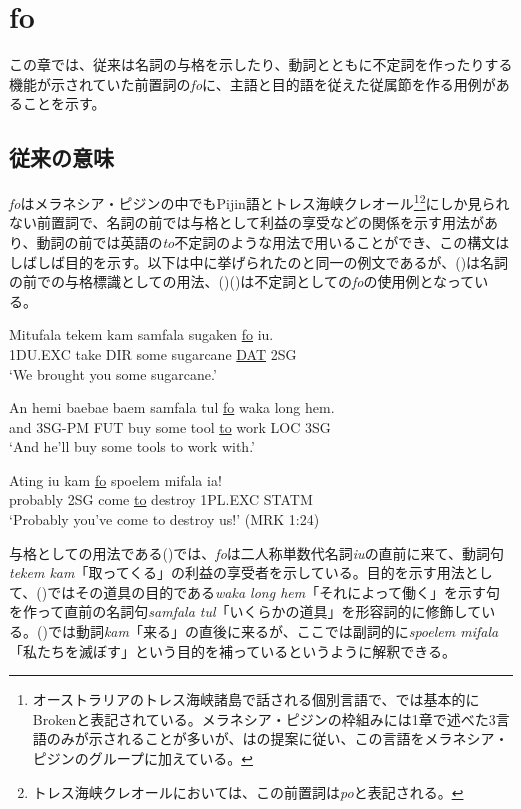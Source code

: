 \chapter{fo}
この章では、従来は名詞の与格を示したり、動詞とともに不定詞を作ったりする機能が示されていた前置詞の\textit{fo}に、主語と目的語を従えた従属節を作る用例があることを示す。

\section{従来の意味}
\textit{fo}はメラネシア・ピジンの中でもPijin語とトレス海峡クレオール\footnote{\label{fn:broken}
オーストラリアのトレス海峡諸島で話される個別言語で、\cite{prepositions}では基本的にBrokenと表記されている。メラネシア・ピジンの枠組みには1章で述べた3言語のみが示されることが多いが、\cite{prepositions}は\cite{keesing}の提案に従い、この言語をメラネシア・ピジンのグループに加えている。}\footnote{トレス海峡クレオールにおいては、この前置詞は\textit{po}と表記される\citep{prepositions}。}にしか見られない前置詞で、名詞の前では与格として利益の享受などの関係を示す用法があり、動詞の前では英語の\textit{to}不定詞のような用法で用いることができ、この構文はしばしば目的を示す\citep{prepositions}。以下は\cite{prepositions}中に挙げられたのと同一の例文であるが、()は名詞の前での与格標識としての用法、()()は不定詞としての\textit{fo}の使用例となっている。

\begin{exe}
\ex
\gll Mitufala tekem kam samfala sugaken \underline{fo} iu.\\
1DU.EXC take DIR some sugarcane \underline{DAT} 2SG\\
\glt `We brought you some sugarcane.' \cite[44]{rr2}

\ex
\gll An hemi baebae baem samfala tul \underline{fo} waka long hem.\\
and 3SG-PM FUT buy some tool \underline{to} work LOC 3SG\\
\glt `And he'll buy some tools to work with.' \cite[270]{todd}

\ex
\gll Ating iu kam \underline{fo} spoelem mifala ia!\\
probably 2SG come \underline{to} destroy 1PL.EXC STATM\\
\glt `Probably you've come to destroy us!' (MRK 1:24)
\end{exe}

与格としての用法である()では、\textit{fo}は二人称単数代名詞\textit{iu}の直前に来て、動詞句\textit{tekem kam}「取ってくる」の利益の享受者を示している。目的を示す用法として、()ではその道具の目的である\textit{waka long hem}「それによって働く」を示す句を作って直前の名詞句\textit{samfala tul}「いくらかの道具」を形容詞的に修飾している。()では動詞\textit{kam}「来る」の直後に来るが、ここでは副詞的に\textit{spoelem mifala}「私たちを滅ぼす」という目的を補っているというように解釈できる。

